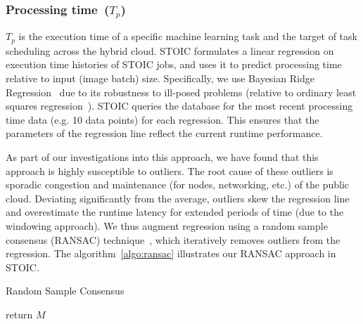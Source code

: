 \subsubsection{Processing time~($T_p$)} 

$T_p$ is the execution time of a
specific machine learning task and the target of task scheduling across the
hybrid cloud. STOIC formulates a linear regression on execution time histories
of STOIC jobs,
and uses it to predict processing time relative to input (image batch) 
size. Specifically,
we use Bayesian Ridge Regression~\cite{ref:brr} due to its robustness to
ill-posed problems (relative to ordinary least squares
regression~\cite{ref:ols}). STOIC queries the database for the most recent
processing time data (e.g. 10 data points) for each regression. This ensures
that the parameters of the regression line reflect the current runtime
performance.
 
As part of our investigations into this approach, we have found that this
approach is highly susceptible to outliers. The root cause of these outliers 
is sporadic
congestion and maintenance (for nodes, networking, etc.) of the public cloud.
Deviating significantly from the average, outliers skew the regression line
and overestimate the runtime latency for extended periods of time (due to the
windowing approach). We thus augment regression using a random sample
consensus (RANSAC) technique~\cite{ref:ransac}, which iteratively removes
outliers from the regression. The algorithm~\ref{algo:ransac} illustrates our
RANSAC approach in STOIC.

\begin{algorithm}[]
\caption{Random Sample Consensus}
\label{algo:ransac}
\SetAlgoLined
{}
 return $M$
\end{algorithm}
 
